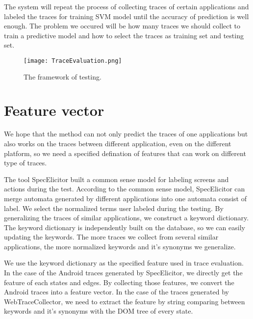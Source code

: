 The system will repeat the process of collecting traces of certain applications
and labeled the traces for training SVM model
until the accuracy of prediction is well enough.
The problem we occured will be how many traces we should collect to train a predictive model and
how to select the traces as training set and testing set.


\begin{figure}[ht]
	\graphicspath{{pic/}}
	\begin{center}
		\texttt{[image: TraceEvaluation.png]}
	\end{center}
	\caption{ The framework of testing. }
	\label{TraceEvaluation}
\end{figure}

\clearpage

\section{Feature vector}

We hope that the method can not only predict the traces of one applications 
but also works on the traces between different application, even on the different platform,
so we need a specified defination of features that can work on different type of traces.

The tool SpecElicitor built a common sense model for labeling screens and actions during the test.
According to the common sense model, 
SpecElicitor can merge automata generated by different applications into one automata consist of label.
We select the normalized terms user labeled during the testing.
By generalizing the traces of similar applications, we construct a keyword dictionary.
The keyword dictionary is independently built on the database,
so we can easily updating the keywords.
The more traces we collect from several similar applications,
the more normalized keywords and it's synonyms we generalize.

We use the keyword dictionary as the specified feature used in trace evaluation.
In the case of the Android traces generated by SpecElicitor,
we directly get the feature of each states and edges.
By collecting those features, we convert the Android traces into a feature vector.
In the case of the traces generated by WebTraceCollector,
we need to extract the feature by string comparing between keywords and it's synonyms with the DOM tree of every state.

